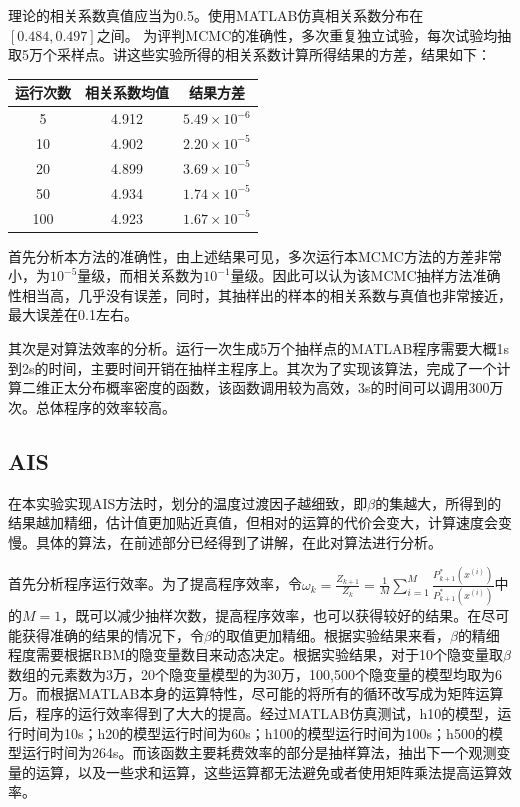\documentclass[journal,a4paper]{IEEEtran}
\begin{document}
		理论的相关系数真值应当为0.5。使用MATLAB仿真相关系数分布在$[0.484,0.497]$之间。
		为评判MCMC的准确性，多次重复独立试验，每次试验均抽取5万个采样点。讲这些实验所得的相关系数计算所得结果的方差，结果如下：
		\begin{center}
		\begin{tabular}{c|cc}
			\hline
			运行次数 & 相关系数均值 & 结果方差\\
			\hline
			5 & 4.912 & $5.49\times10^{-6}$ \\
			10 & 4.902 & $2.20\times10^{-5}$ \\
			20 & 4.899 & $3.69\times10^{-5}$ \\
			50 & 4.934 & $1.74\times10^{-5}$ \\
			100 & 4.923 & $1.67\times10^{-5}$ \\
			\hline
		\end{tabular}
		\end{center}
	
		首先分析本方法的准确性，由上述结果可见，多次运行本MCMC方法的方差非常小，为$10^{-5}$量级，而相关系数为$10^{-1}$量级。因此可以认为该MCMC抽样方法准确性相当高，几乎没有误差，同时，其抽样出的样本的相关系数与真值也非常接近，最大误差在0.1左右。
		
		其次是对算法效率的分析。运行一次生成5万个抽样点的MATLAB程序需要大概1s到2s的时间，主要时间开销在抽样主程序上。其次为了实现该算法，完成了一个计算二维正太分布概率密度的函数，该函数调用较为高效，3s的时间可以调用300万次。总体程序的效率较高。

	\subsection{AIS}
		在本实验实现AIS方法时，划分的温度过渡因子越细致，即$\beta$的集越大，所得到的结果越加精细，估计值更加贴近真值，但相对的运算的代价会变大，计算速度会变慢。具体的算法，在前述部分已经得到了讲解，在此对算法进行分析。
		
		首先分析程序运行效率。为了提高程序效率，令$ \omega_k = \frac{Z_{k+1}}{Z_k} =\frac{1}{M} \sum_{i = 1}^{M} \frac{P_{k+1}^*(x^{(i)})}{P_{k+1}^*(x^{(i)})}$中的$M=1$，既可以减少抽样次数，提高程序效率，也可以获得较好的结果。在尽可能获得准确的结果的情况下，令$\beta$的取值更加精细。根据实验结果来看，$\beta$的精细程度需要根据RBM的隐变量数目来动态决定。根据实验结果，对于10个隐变量取$\beta$数组的元素数为3万，20个隐变量模型的为30万，100,500个隐变量的模型均取为6万。而根据MATLAB本身的运算特性，尽可能的将所有的循环改写成为矩阵运算后，程序的运行效率得到了大大的提高。经过MATLAB仿真测试，h10的模型，运行时间为10s；h20的模型运行时间为60s；h100的模型运行时间为100s；h500的模型运行时间为264s。而该函数主要耗费效率的部分是抽样算法，抽出下一个观测变量的运算，以及一些求和运算，这些运算都无法避免或者使用矩阵乘法提高运算效率。
		
\end{document}
